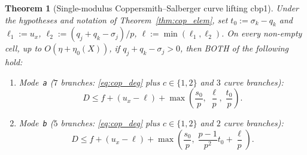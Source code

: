 \documentclass[11pt,a4paper]{amsart}
\theoremstyle{plain}
\newtheorem{theorem}{Theorem}[section]
\theoremstyle{definition}
\theoremstyle{remark}
\begin{document}
\begin{theorem}[Single-modulus Coppersmith--Salberger curve lifting \textsf{cbp1}]\label{thm:cbp1}
Under the hypotheses and notation of Theorem~\ref{thm:cop_elem}, set $t_0 := \sigma_k - q_k$ and $\ell_1 := u_x$, $\ell_2 := (q_j + q_k - \sigma_j)/p$, $\ell := \min(\ell_1, \ell_2)$. On every non-empty cell, up to $O(\eta + \eta_0(X))$, if $q_j + q_k - \sigma_j > 0$, then BOTH of the following hold:
\begin{enumerate}[label=(\roman*)]
\item \emph{Mode~\texttt{a} ($7$ branches: \eqref{eq:cop_deg} plus $c \in \{1,2\}$ and $3$ curve branches):}
\begin{equation}\label{eq:cbp1_a}
  D \le f + (u_x - \ell) + \max\!\left(\frac{s_0}{p},\; \frac{\ell}{p},\; \frac{t_0}{p}\right).
\end{equation}
\item \emph{Mode~\texttt{b} ($5$ branches: \eqref{eq:cop_deg} plus $c \in \{1,2\}$ and $2$ curve branches):}
\begin{equation}\label{eq:cbp1_b}
  D \le f + (u_x - \ell) + \max\!\left(\frac{s_0}{p},\; \frac{p-1}{p^2} t_0 + \frac{\ell}{p}\right).
\end{equation}
\end{enumerate}
\end{theorem}
\end{document}
